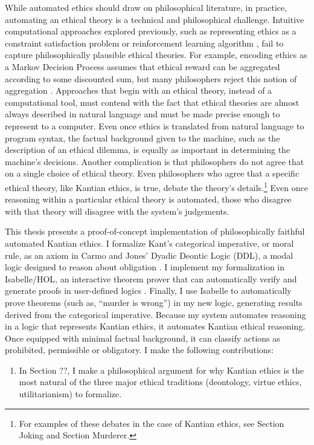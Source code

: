 \begin{isabellebody}
\begin{isamarkuptext}
While automated ethics should draw on philosophical literature, in practice, automating an ethical 
theory is a technical and philosophical challenge. Intuitive computational approaches explored 
previously, such as representing ethics as a constraint satisfaction problem \citep{csp} or reinforcement 
learning algorithm \citep{util1}, fail to capture philosophically plausible ethical theories. For 
example, encoding ethics as a Markov Decision Process assumes that ethical reward can be aggregated 
according to some discounted sum, but many philosophers reject this notion of aggregation \citep{consequentialismsep}. 
Approaches that begin with an ethical theory, instead of a computational tool, must contend with the 
fact that ethical theories are almost always described in natural language and must be made
precise enough to represent to a computer. Even once ethics is translated from natural 
language to program syntax, the factual background given to the machine, such as the description of 
an ethical dilemma, is equally as important in determining the machine's decisions. Another complication
is that philosophers do not agree that on a single choice of ethical theory. Even philosophers who
agree that a specific ethical theory, like Kantian ethics, is true, debate the theory's 
details.\footnote{For examples of these debates in the case of Kantian ethics, see Section Joking
and Section Murderer.} Even once reasoning within a 
particular ethical theory is automated, those who disagree with that theory will disagree with the 
system's judgements.

This thesis presents a proof-of-concept implementation of philosophically faithful automated Kantian ethics. 
I formalize Kant's categorical imperative, or moral rule, as an axiom 
in Carmo and Jones' Dyadic Deontic Logic (DDL), a modal logic designed to reason about 
obligation \citep{CJDDL}. I implement my formalization in Isabelle/HOL, an interactive theorem prover 
that can automatically verify and generate proofs in user-defined logics \citep{isabelle}. Finally, 
I use Isabelle to automatically prove theorems (such as, ``murder is wrong'') in my new logic, 
generating results derived from the categorical imperative. Because my system automates reasoning in 
a logic that represents Kantian ethics, it automates Kantian ethical reasoning. Once equipped with 
minimal factual background, it can classify actions as prohibited, permissible or obligatory. I 
make the following contributions:%
\end{isamarkuptext}\isamarkuptrue%
%
\begin{isamarkuptext}%
\begin{enumerate}
\item In Section ??, I make a philosophical argument for why Kantian ethics is the most natural of the three major
ethical traditions (deontology, virtue ethics, utilitarianism) to formalize.


\end{enumerate}
\end{isamarkuptext}
\end{isabellebody}
